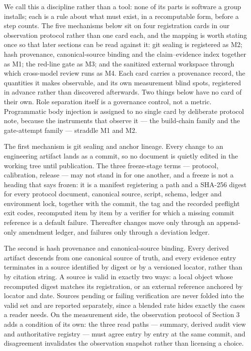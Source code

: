 \documentclass[
  english,
]{article}
\begin{document}
We call this a discipline rather than a tool: none of its parts is software a group installs; each is a rule about what must exist, in a recomputable form, before a step counts. The five mechanisms below sit on four registration cards in our observation protocol rather than one card each, and the mapping is worth stating once so that later sections can be read against it: git sealing is registered as M2; hash provenance, canonical-source binding and the claim--evidence index together as M1; the red-line gate as M3; and the sanitized external workspace through which cross-model review runs as M4. Each card carries a provenance record, the quantities it makes observable, and its own measurement blind spots, registered in advance rather than discovered afterwards. Two things below have no card of their own. Role separation itself is a governance control, not a metric. Programmatic body injection is assigned to no single card by deliberate protocol note, because the instruments that observe it --- the build-chain family and the gate-attempt family --- straddle M1 and M2.

The first mechanism is git sealing and anchor lineage. Every change to an engineering artifact lands as a commit, so no document is quietly edited in the working tree until publication. The three freeze-stage terms --- protocol, calibration, release --- may not stand in for one another, and a freeze is not a heading that says frozen: it is a manifest registering a path and a SHA-256 digest for every protocol document, canonical source, script, schema, ledger and environment lock, together with the commit, the tag and the recorded preflight exit codes, recomputed item by item by a verifier for which a missing commit reference is a default failure. Thereafter changes move only through an append-only amendment ledger, and failures only through a deviation ledger.

The second is hash provenance and canonical-source binding. Every derived artifact descends from one canonical source of truth, and every evidence entry terminates in a source identified by digest or by a versioned locator, rather than by citation string. A source is valid in exactly two ways: a local object whose recomputed digest matches its registration, or an external reference anchored by locator and date. Sources pending or failing verification are never folded into the valid set and are reported separately, since a blended rate hides exactly the cases a reader needs. On the measurement side, the observation protocol of Section 3 adds a condition of its own: the three read paths --- summary, derived audit view and authoritative registry --- must agree entry by entry at the same commit, and disagreement invalidates the observation snapshot rather than licensing a choice.
\end{document}
